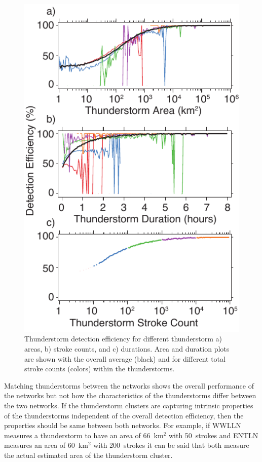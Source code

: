 \begin{figure}[ht!]
   \centering
   \includegraphics[scale=1]{thunderstorm/Figures/deParameter.pdf}
   \caption{Thunderstorm detection efficiency for different thunderstorm a) areas, b) stroke counts, and c) durations.
           Area and duration plots are shown with the overall average (black) and for different total stroke counts (colors) within the thunderstorms.}
   \label{thunderstorm:fig:deParameter}
\end{figure}

Matching thunderstorms between the networks shows the overall performance of the networks but not how the characteristics of the thunderstorms differ between the two networks.
If the thunderstorm clusters are capturing intrinsic properties of the thunderstorms independent of the overall detection efficiency, then the properties should be same between both networks.
For example, if WWLLN measures a thunderstorm to have an area of 66~km$^2$ with 50~strokes and ENTLN measures an area of 60~km$^2$ with 200~strokes it can be said that both measure the actual estimated area of the thunderstorm cluster.

